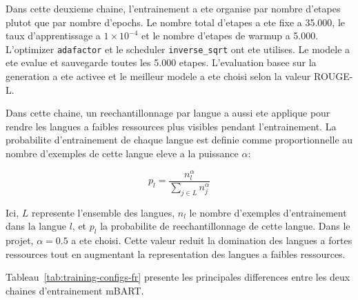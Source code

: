 Dans cette deuxieme chaine, l'entrainement a ete organise par nombre d'etapes plutot que par nombre d'epochs. Le nombre total d'etapes a ete fixe a 35.000, le taux d'apprentissage a $1 \times 10^{-4}$ et le nombre d'etapes de warmup a 5.000. L'optimizer \texttt{adafactor} et le scheduler \texttt{inverse\_sqrt} ont ete utilises. Le modele a ete evalue et sauvegarde toutes les 5.000 etapes. L'evaluation basee sur la generation a ete activee et le meilleur modele a ete choisi selon la valeur ROUGE-L.

Dans cette chaine, un reechantillonnage par langue a aussi ete applique pour rendre les langues a faibles ressources plus visibles pendant l'entrainement. La probabilite d'entrainement de chaque langue est definie comme proportionnelle au nombre d'exemples de cette langue eleve a la puissance $\alpha$:

\begin{equation}
p_l = \frac{n_l^{\alpha}}{\sum_{j \in L} n_j^{\alpha}}
\label{eq:language-smoothing-fr}
\end{equation}

Ici, $L$ represente l'ensemble des langues, $n_l$ le nombre d'exemples d'entrainement dans la langue $l$, et $p_l$ la probabilite de reechantillonnage de cette langue. Dans le projet, $\alpha=0.5$ a ete choisi. Cette valeur reduit la domination des langues a fortes ressources tout en augmentant la representation des langues a faibles ressources.

Tableau~\ref{tab:training-configs-fr} presente les principales differences entre les deux chaines d'entrainement mBART.

